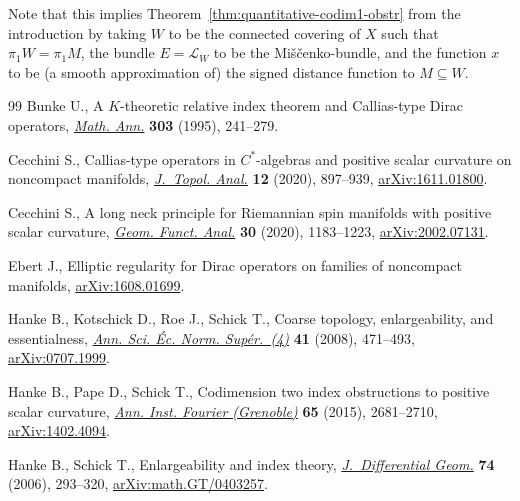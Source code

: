 \documentclass[11pt]{article}
\numberwithin{equation}{section}
\newcommand*{\Mishchenko}{Mi\v{s}\v{c}enko}
\begin{document}
\setcounter{section}{3}
\setcounter{subsection}{0}
\setcounter{subsubsection}{0}
\setcounter{Theorem}{2}
\setcounter{equation}{3}
 Note that this implies Theorem~\ref{thm:quantitative-codim1-obstr} from the introduction by taking \(W\) to be the connected covering of \(X\) such that \(\pi_1 W = \pi_1 M\), the bundle \(E = \mathcal{L}_W\) to be the \Mishchenko-bundle, and the function \(x\) to be (a smooth approximation of) the signed distance function to \(M \subseteq W\).
\begin{thebibliography}{99}
Bunke U., A {$K$}-theoretic relative index theorem and {C}allias-type {D}irac
 operators, \href{https://doi.org/10.1007/BF01460989}{\textit{Math. Ann.}} \textbf{303} (1995), 241--279.

Cecchini S., Callias-type operators in {$C^*$}-algebras and positive scalar
 curvature on noncompact manifolds, \href{https://doi.org/10.1142/S1793525319500687}{\textit{J.~Topol. Anal.}} \textbf{12}
 (2020), 897--939, \href{https://arxiv.org/abs/1611.01800}{arXiv:1611.01800}.

Cecchini S., A long neck principle for Riemannian spin manifolds with positive
 scalar curvature, \href{https://doi.org/10.1007/s00039-020-00545-1}{\textit{Geom. Funct. Anal.}} \textbf{30} (2020), 1183--1223,
 \href{https://arxiv.org/abs/2002.07131}{arXiv:2002.07131}.

Ebert J., Elliptic regularity for {D}irac operators on families of noncompact
 manifolds, \href{https://arxiv.org/abs/1608.01699}{arXiv:1608.01699}.

Hanke B., Kotschick D., Roe J., Schick T., Coarse topology, enlargeability, and
 essentialness, \href{https://doi.org/10.24033/asens.2073}{\textit{Ann. Sci. \'Ec. Norm. Sup\'er.~(4)}} \textbf{41}
 (2008), 471--493, \href{https://arxiv.org/abs/0707.1999}{arXiv:0707.1999}.

Hanke B., Pape D., Schick T., Codimension two index obstructions to positive
 scalar curvature, \href{https://doi.org/10.5802/aif.3000}{\textit{Ann. Inst. Fourier (Grenoble)}} \textbf{65} (2015),
 2681--2710, \href{https://arxiv.org/abs/1402.4094}{arXiv:1402.4094}.

Hanke B., Schick T., Enlargeability and index theory, \href{https://doi.org/10.4310/jdg/1175266206}{\textit{J.~Differential
 Geom.}} \textbf{74} (2006), 293--320, \href{https://arxiv.org/abs/math.GT/0403257}{arXiv:math.GT/0403257}.


\end{thebibliography}
\end{document}
